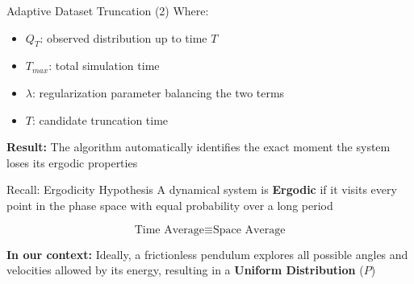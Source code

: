 \begin{frame}{Adaptive Dataset Truncation (2)}
    Where:
    \begin{itemize}
        \item $ Q_T $: observed distribution up to time $ T $
        \item $ T_{max} $: total simulation time
        \item $ \lambda $: regularization parameter balancing the two terms
        \item $ T $: candidate truncation time
    \end{itemize}
    
    \vspace{0.2cm}
    \small{\textbf{Result:} The algorithm automatically identifies the exact moment the system loses its ergodic properties}
    
    \begin{block}{Recall: Ergodicity Hypothesis}
    A dynamical system is \textbf{Ergodic} if it visits every point in the phase space with equal probability over a long period
    
    \vspace{0.1cm}
    $$ \text{Time Average} \equiv \text{Space Average} $$
    
    \vspace{0.1cm}
    \footnotesize{\textbf{In our context:} Ideally, a frictionless pendulum explores all possible angles and velocities allowed by its energy, resulting in a \textbf{Uniform Distribution} ($P$)}
\end{block}

\end{frame}

